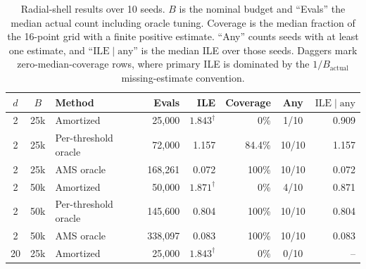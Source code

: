 \documentclass[twoside,11pt]{article}
\begin{document}
\begin{table}[ht!]
    \centering
    \small
    \caption{
    Radial-shell results over 10 seeds. \(B\) is the nominal budget and “Evals” the median actual count including oracle tuning. Coverage is the median fraction of the 16-point grid with a finite positive estimate. “Any” counts seeds with at least one estimate, and “$\mathrm{ILE}\mid\mathrm{any}$” is the median ILE over those seeds. Daggers mark zero-median-coverage rows, where primary ILE is dominated by the $1/B_{\mathrm{actual}}$ missing-estimate convention.
    }
    \label{tab:shell-results}
    \begin{tabular}{@{}cc l r r r c r@{}}
        \toprule
        $d$ & $B$ & Method
        & Evals
        & ILE
        & Coverage
        & Any
        & $\mathrm{ILE}\mid\mathrm{any}$ \\
        \midrule

        2 & 25k
          & Amortized
          & 25,000
          & $1.843^{\dagger}$
          & 0\%
          & 1/10
          & 0.909 \\

        2 & 25k
          & Per-threshold oracle
          & 72,000
          & 1.157
          & 84.4\%
          & 10/10
          & 1.157 \\

        2 & 25k
          & AMS oracle
          & 168,261
          & 0.072
          & 100\%
          & 10/10
          & 0.072 \\

        \addlinespace

        2 & 50k
          & Amortized
          & 50,000
          & $1.871^{\dagger}$
          & 0\%
          & 4/10
          & 0.871 \\

        2 & 50k
          & Per-threshold oracle
          & 145,600
          & 0.804
          & 100\%
          & 10/10
          & 0.804 \\
          
        2 & 50k
          & AMS oracle
          & 338,097
          & 0.083
          & 100\%
          & 10/10
          & 0.083 \\

        \midrule

        20 & 25k
           & Amortized
           & 25,000
           & $1.843^{\dagger}$
           & 0\%
           & 0/10
           & -- \\


\end{tabular}
\end{table}
\end{document}
